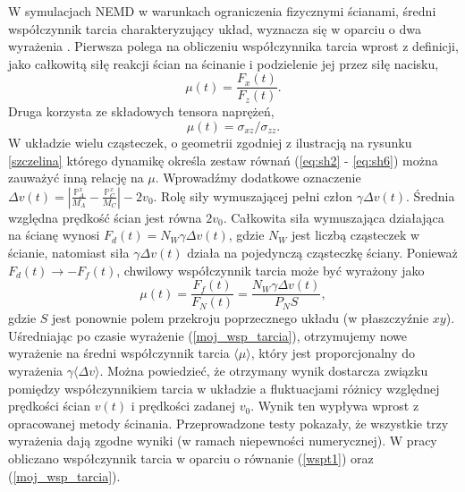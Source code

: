 \documentclass[12pt,a4paper,openright]{report} %
\begin{document}
W symulacjach NEMD w warunkach ograniczenia fizycznymi ścianami, średni współczynnik tarcia charakteryzujący układ, wyznacza się w oparciu o dwa wyrażenia \cite{DMH1, Gattinoni2013}. Pierwsza polega na obliczeniu współczynnika tarcia wprost z definicji, jako całkowitą siłę reakcji ścian na ścinanie i podzielenie jej przez siłę nacisku,
\begin{equation}
\mu(t)=\frac{F_x(t)}{F_z(t)}.
\label{wspt1}
\end{equation} 
Druga korzysta ze składowych tensora naprężeń,
\begin{equation}
\mu(t)=\sigma_{xz} / \sigma_{zz}.
\label{wspt2}
\end{equation}
%
W układzie wielu cząsteczek, o geometrii zgodniej z ilustracją na rysunku \ref{szczelina} którego dynamikę określa zestaw równań (\ref{eq:sh2} - \ref{eq:sh6}) można zauważyć inną relację na $\mu$. Wprowadźmy dodatkowe oznaczenie $\Delta v(t) = \left| \frac{\mathbb{P}^x_A}{M_A} - \frac{\mathbb{P}^x_C}{M_C} \right| - 2v_0$. Rolę siły wymuszającej pełni człon $\gamma \Delta v(t)$. Średnia względna prędkość ścian jest równa $2v_0$. Całkowita siła wymuszająca działająca na ścianę wynosi $F_d(t)=N_W \gamma \Delta v(t)$, gdzie $N_W$ jest liczbą cząsteczek w ścianie, natomiast siła $\gamma \Delta v(t)$ działa na pojedynczą cząsteczkę ściany. Ponieważ $F_d (t) \to -F_f(t)$, chwilowy współczynnik tarcia może być wyrażony jako
\begin{equation}
\mu(t)=\frac{F_f(t)}{F_N(t)}=\frac{N_W \gamma \Delta v(t)}{P_N S},
\label{moj_wsp_tarcia}
\end{equation}
gdzie $S$ jest ponownie polem przekroju poprzecznego układu (w płaszczyźnie $xy$). Uśredniając po czasie wyrażenie (\ref{moj_wsp_tarcia}), otrzymujemy nowe wyrażenie na średni współczynnik tarcia $\langle \mu \rangle$, który jest proporcjonalny do wyrażenia $\gamma \langle \Delta v\rangle$. Można powiedzieć, że otrzymany wynik dostarcza związku pomiędzy współczynnikiem tarcia w układzie a fluktuacjami różnicy względnej prędkości ścian $v(t)$ i prędkości zadanej $v_0$. Wynik ten wypływa wprost z opracowanej metody ścinania. Przeprowadzone testy pokazały, że wszystkie trzy wyrażenia dają zgodne wyniki (w ramach niepewności numerycznej). W pracy obliczano współczynnik tarcia w oparciu o równanie (\ref{wspt1}) oraz (\ref{moj_wsp_tarcia}).
%
\end{document}
